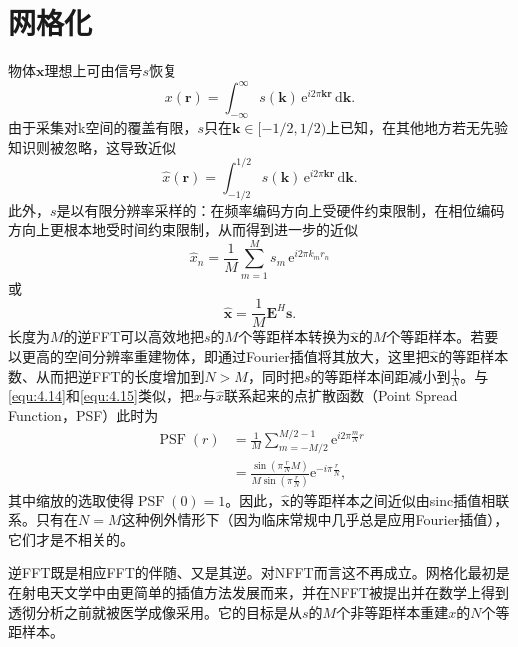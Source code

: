 \documentclass[12pt]{article}
\let\originallautoref\autoref
\renewcommand{\autoref}[1]{\allowbreak\originallautoref{#1}}
\begin{document}
\section{网格化}
物体$\bm{x}$理想上可由信号$s$恢复
\begin{equation}
    x(\bm{r})=\int_{-\infty}^{\infty}s(\bm{k})\,\mathrm{e}^{i2\pi\bm{k}\bm{r}}\,\mathrm{d}\bm{k}.
    \label{equ:4.33}
\end{equation}
由于采集对k空间的覆盖有限，$s$只在$\bm{k}\in[-1/2,1/2)$上已知，在其他地方若无先验知识则被忽略，这导致近似
\begin{equation}
    \hat{x}(\bm{r})=\int_{-1/2}^{1/2}s(\bm{k})\,\mathrm{e}^{i2\pi\bm{k}\bm{r}}\,\mathrm{d}\bm{k}.
    \label{equ:4.34}
\end{equation}
此外，$s$是以有限分辨率采样的：在频率编码方向上受硬件约束限制，在相位编码方向上更根本地受时间约束限制，从而得到进一步的近似
\begin{equation}
    \hat{x}_n=\frac{1}{M}\sum_{m=1}^{M}s_m\,\mathrm{e}^{i2\pi k_mr_n}
    \label{equ:4.35}
\end{equation}
或
\begin{equation}
    \hat{\bm{x}}=\frac{1}{M}\mathbf{E}^H\bm{s}.
    \label{equ:4.36}
\end{equation}
长度为$M$的逆FFT可以高效地把$s$的$M$个等距样本转换为$\hat{\bm{x}}$的$M$个等距样本。若要以更高的空间分辨率重建物体，即通过Fourier插值将其放大，这里把$\hat{\bm{x}}$的等距样本数、从而把逆FFT的长度增加到$N>M$，同时把$s$的等距样本间距减小到$\frac{1}{N}$。与\autoref{equ:4.14}和\autoref{equ:4.15}类似，把$x$与$\hat{x}$联系起来的点扩散函数（Point Spread Function，PSF）\label{term:PSF}此时为
\begin{equation}
    \begin{aligned}
        \operatorname{PSF}(r)&=\frac{1}{M}\sum_{m=-M/2}^{M/2-1}\mathrm{e}^{i2\pi\frac{m}{N}r}\\
        &=\frac{\sin\left(\pi\frac{r}{N}M\right)}{M\sin\left(\pi\frac{r}{N}\right)}\mathrm{e}^{-i\pi\frac{r}{N}},
    \end{aligned}
    \label{equ:4.37}
\end{equation}
其中缩放的选取使得$\operatorname{PSF}(0)=1$。因此，$\hat{\bm{x}}$的等距样本之间近似由sinc插值相联系。只有在$N=M$这种例外情形下（因为临床常规中几乎总是应用Fourier插值），它们才是不相关的。

逆FFT既是相应FFT的伴随、又是其逆。对NFFT而言这不再成立。网格化最初是在射电天文学中由更简单的插值方法发展而来，并在NFFT被提出并在数学上得到透彻分析之前就被医学成像采用。它的目标是从$s$的$M$个非等距样本重建$x$的$N$个等距样本。
\end{document}

